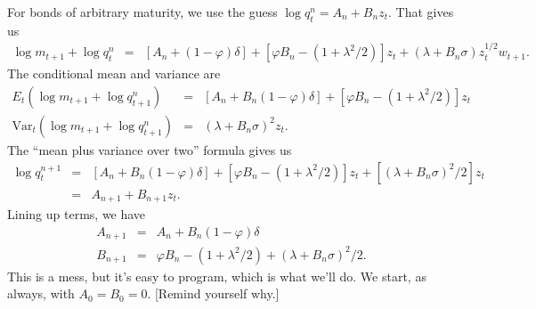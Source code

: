 \documentclass[11pt]{article}
\begin{document}
For bonds of arbitrary maturity,
we use the guess  $ \log q^n_t = A_n + B_n z_t$.
That gives us
\begin{eqnarray*}
    \log m_{t+1} + \log q^{n}_t &=&
            [A_n + (1-\varphi) \delta] + [\varphi B_n -(1+\lambda^2/2)] z_t
                    + (\lambda + B_n \sigma) z_t^{1/2} w_{t+1} .
\end{eqnarray*}
The conditional mean and variance are
\begin{eqnarray*}
   E_t \left( \log m_{t+1} + \log q^{n}_{t+1} \right) &=&
            [A_n + B_n (1-\varphi) \delta] + [\varphi B_n -(1+\lambda^2/2)] z_t \\
   \mbox{Var}_t \left( \log m_{t+1} + \log q^{n}_{t+1} \right) &=&
            (\lambda + B_n \sigma)^2 z_t .
\end{eqnarray*}
The ``mean plus variance over two'' formula gives us
\begin{eqnarray*}
    \log q^{n+1}_t &=&
            [A_n + B_n (1-\varphi) \delta] + [\varphi B_n -(1+\lambda^2/2)] z_t
                    + [(\lambda + B_n \sigma)^2/2]  z_t  \\
                &=& A_{n+1} + B_{n+1} z_t.
\end{eqnarray*}
Lining up terms, we have
\begin{eqnarray*}
    A_{n+1} &=& A_n + B_n (1-\varphi) \delta \\
    B_{n+1} &=& \varphi B_n -(1+\lambda^2/2) + (\lambda + B_n \sigma)^2/2 .
\end{eqnarray*}
This is a mess, but it's easy to program, which is what we'll do.
We start, as always, with $A_0 = B_0 = 0$.
[Remind yourself why.]

\begin{comment}
\begin{table}[h]
\centering
\caption{Properties of forward rates}
\begin{tabular}{lrrr}
\toprule
Forward rate $f^n_t$    &  Mean  &  Std Dev  &  Autocorr \\
\midrule
$f^0_t$                 &  6.683 & 2.703     &  0.959   \\
$f^{12}_t$              &  7.921 & 2.495     &  0.969   \\
$f^{120}_t$             &  8.858 & 1.946     &  0.980   \\
\bottomrule
\end{tabular}
\label{tab:forward-moments}
\end{table}
\end{comment}
\end{document}
